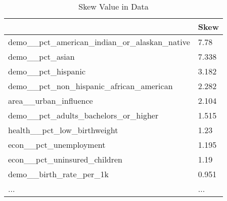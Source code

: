 \begin{table}[]
\small
\caption{Skew Value in Data} \label{tab:skew_01}
\centering
\begin{tabular}{ll}
\hline
                                                   & Skew  \\ \hline
demo\_\_pct\_american\_indian\_or\_alaskan\_native & 7.78  \\
demo\_\_pct\_asian                                 & 7.338 \\
demo\_\_pct\_hispanic                              & 3.182 \\
demo\_\_pct\_non\_hispanic\_african\_american      & 2.282 \\
area\_\_urban\_influence                           & 2.104 \\
demo\_\_pct\_adults\_bachelors\_or\_higher         & 1.515 \\
health\_\_pct\_low\_birthweight                    & 1.23  \\
econ\_\_pct\_unemployment                          & 1.195 \\
econ\_\_pct\_uninsured\_children                   & 1.19  \\
demo\_\_birth\_rate\_per\_1k                       & 0.951 \\
...												  & ...   \\
\hline
\end{tabular}
\end{table}